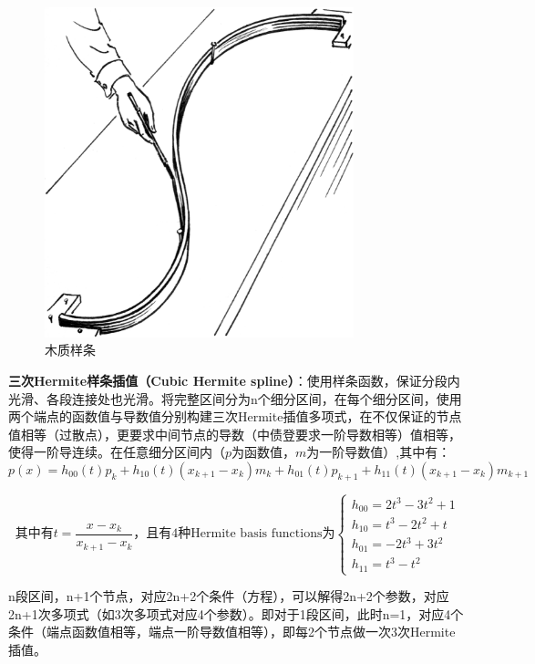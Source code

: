 \documentclass[11pt]{article}
\begin{document}
\begin{figure}[H]
    \centering
    \includegraphics[width=0.8\textwidth]{fig/spline.png}
	\caption{木质样条}
    \label{fig:spline}
\end{figure}

\textbf{三次Hermite样条插值（Cubic Hermite spline）}：使用样条函数，保证分段内光滑、各段连接处也光滑。将完整区间分为n个细分区间，在每个细分区间，使用两个端点的函数值与导数值分别构建三次Hermite插值多项式，在不仅保证的节点值相等（过散点），更要求中间节点的导数（中债登要求一阶导数相等）值相等，使得一阶导连续。在任意细分区间内（$p$为函数值，$m$为一阶导数值）,其中有：
\begin{equation*}
	p(x) = h_{00}(t) p_k + h_{10}(t)(x_{k+1} - x_k)m_k + h_{01}(t)p_{k+1} + h_{11}(t)(x_{k+1}-x_k) m_{k+1}
\end{equation*}

\begin{equation*}
	\text{其中有}
	t=\frac{x-x_k}{x_{k+1}-x_k} \text{，且有4种Hermite basis functions为}
	\begin{cases}
		h_{00} = 2t^3 - 3t^2 +1 \\
		h_{10} = t^3 - 2t^2 + t \\
		h_{01} = -2t^3 + 3t^2\\
		h_{11} = t^3 -t^2
	\end{cases}
\end{equation*}

n段区间，n+1个节点，对应2n+2个条件（方程），可以解得2n+2个参数，对应2n+1次多项式（如3次多项式对应4个参数）。即对于1段区间，此时n=1，对应4个条件（端点函数值相等，端点一阶导数值相等），即每2个节点做一次3次Hermite插值。
\end{document}
